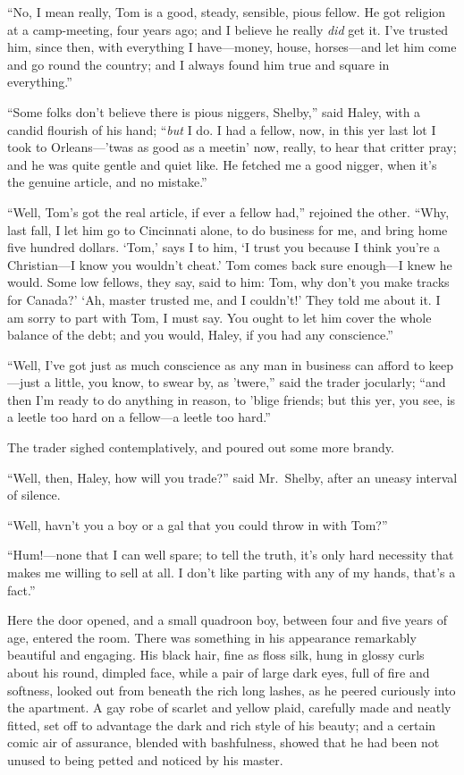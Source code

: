 ``No, I mean really, Tom is a good, steady, sensible, pious fellow.
He got religion at a camp-meeting, four years ago; and I believe
he really \emph{did} get it. I've trusted him, since then, with everything
I have---money, house, horses---and let him come and go round the
country; and I always found him true and square in everything.''

``Some folks don't believe there is pious niggers, Shelby,'' said Haley, with a
candid flourish of his hand; ``\emph{but} I do. I had a fellow, now, in this yer
last lot I took to Orleans---'twas as good as a meetin' now, really, to hear
that critter pray; and he was quite gentle and quiet like. He fetched me a good
nigger, when it's the genuine article, and no mistake.''

``Well, Tom's got the real article, if ever a fellow had,'' rejoined the other.
``Why, last fall, I let him go to Cincinnati alone, to do business for me, and
bring home five hundred dollars. `Tom,' says I to him, `I trust you because I
think you're a Christian---I know you wouldn't cheat.' Tom comes back sure
enough---I knew he would. Some low fellows, they say, said to him: Tom, why
don't you make tracks for Canada?' `Ah, master trusted me, and I couldn't!' They
told me about it. I am sorry to part with Tom, I must say. You ought to let him
cover the whole balance of the debt; and you would, Haley, if you had any
conscience.''

``Well, I've got just as much conscience as any man in business can afford to
keep---just a little, you know, to swear by, as 'twere,'' said the trader
jocularly; ``and then I'm ready to do anything in reason, to 'blige friends; but
this yer, you see, is a leetle too hard on a fellow---a leetle too hard.''

The trader sighed contemplatively, and poured out some more brandy.

``Well, then, Haley, how will you trade?'' said Mr.\ Shelby, after an uneasy
interval of silence.

``Well, havn't you a boy or a gal that you could throw in with Tom?''

``Hum!---none that I can well spare; to tell the truth, it's only hard necessity
that makes me willing to sell at all. I don't like parting with any of my hands,
that's a fact.''

Here the door opened, and a small quadroon boy, between four and five years of
age, entered the room. There was something in his appearance remarkably
beautiful and engaging. His black hair, fine as floss silk, hung in glossy curls
about his round, dimpled face, while a pair of large dark eyes, full of fire and
softness, looked out from beneath the rich long lashes, as he peered curiously
into the apartment. A gay robe of scarlet and yellow plaid, carefully made and
neatly fitted, set off to advantage the dark and rich style of his beauty; and a
certain comic air of assurance, blended with bashfulness, showed that he had
been not unused to being petted and noticed by his master.

